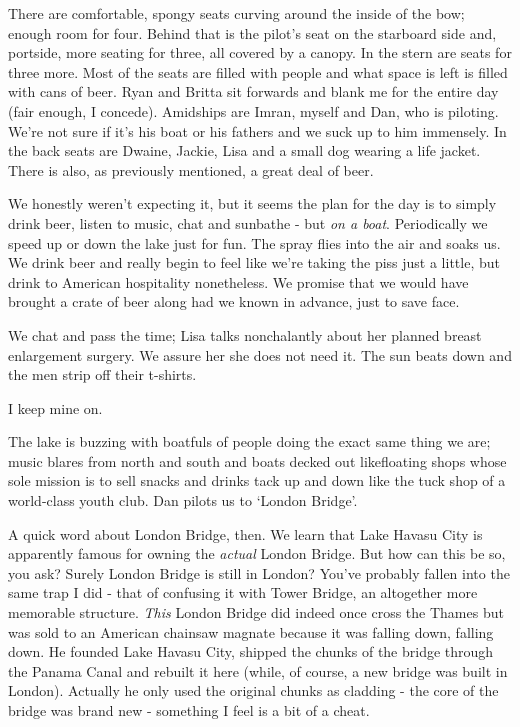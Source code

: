 \documentclass[a5paper,titlepage,11pt]{book}
\begin{document}
There are comfortable, spongy seats curving around the inside of the bow; enough room for four.  Behind that is the pilot's seat on the starboard side and, portside, more seating for three, all covered by a canopy.  In the stern are seats for three more.  Most of the seats are filled with people and what space is left is filled with cans of beer.  Ryan and Britta sit forwards and blank me for the entire day (fair enough, I concede).  Amidships are Imran, myself and Dan, who is piloting.  We're not sure if it's his boat or his fathers and we suck up to him immensely.  In the back seats are Dwaine, Jackie, Lisa and a small dog wearing a life jacket.  There is also, as previously mentioned, a great deal of beer.

We honestly weren't expecting it, but it seems the plan for the day is to simply drink beer, listen to music, chat and sunbathe - but \emph{on a boat}.  Periodically we speed up or down the lake just for fun.  The spray flies into the air and soaks us.  We drink beer and really begin to feel like we're taking the piss just a little, but drink to American hospitality nonetheless.  We promise that we would have brought a crate of beer along had we known in advance, just to save face.


We chat and pass the time; Lisa talks nonchalantly about her planned breast enlargement surgery.  We assure her she does not need it.  The sun beats down and the men strip off their t-shirts.

I keep mine on.

The lake is buzzing with boatfuls of people doing the exact same thing we are; music blares from north and south and boats decked out likefloating shops whose sole mission is to sell snacks and drinks tack up and down like the tuck shop of a world-class youth club.  Dan pilots us to `London Bridge'.

A quick word about London Bridge, then.  We learn that Lake Havasu City is apparently famous for owning the \emph{actual} London Bridge.  But how can this be so, you ask?  Surely London Bridge is still in London?  You've probably fallen into the same trap I did - that of confusing it with Tower Bridge, an altogether more memorable structure.  \emph{This} London Bridge did indeed once cross the Thames but was sold to an American chainsaw magnate because it was falling down, falling down.  He founded Lake Havasu City, shipped the chunks of the bridge through the Panama Canal and rebuilt it here (while, of course, a new bridge was built in London).  Actually he only used the original chunks as cladding - the core of the bridge was brand new - something I feel is a bit of a cheat.
\end{document}
